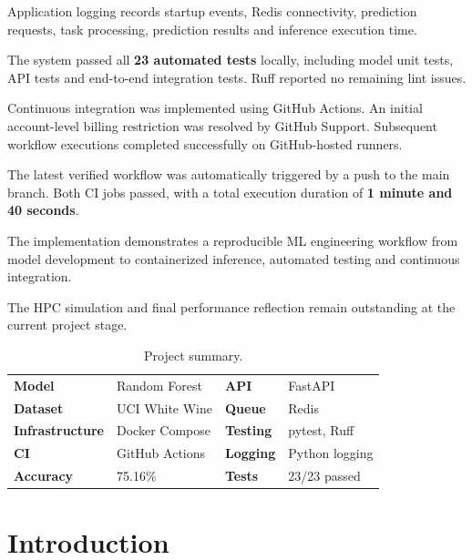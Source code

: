 \documentclass[11pt,a4paper]{article}
\begin{document}
Application logging records startup events, Redis
connectivity, prediction requests, task processing,
prediction results and inference execution time.

The system passed all \textbf{23 automated tests} locally,
including model unit tests, API tests and end-to-end
integration tests. Ruff reported no remaining lint issues.

Continuous integration was implemented using GitHub Actions.
An initial account-level billing restriction was resolved
by GitHub Support. Subsequent workflow executions completed
successfully on GitHub-hosted runners.

The latest verified workflow was automatically triggered
by a push to the main branch. Both CI jobs passed, with a
total execution duration of \textbf{1 minute and 40 seconds}.

The implementation demonstrates a reproducible ML
engineering workflow from model development to
containerized inference, automated testing and continuous
integration.

The HPC simulation and final performance reflection remain
outstanding at the current project stage.

\begin{table}[H]
\centering
\begin{tabularx}{\linewidth}{@{}lXlX@{}}
\toprule
\textbf{Model} & Random Forest &
\textbf{API} & FastAPI\\

\textbf{Dataset} & UCI White Wine &
\textbf{Queue} & Redis\\

\textbf{Infrastructure} & Docker Compose &
\textbf{Testing} & pytest, Ruff\\

\textbf{CI} & GitHub Actions &
\textbf{Logging} & Python logging\\

\textbf{Accuracy} & 75.16\% &
\textbf{Tests} & 23/23 passed\\
\bottomrule
\end{tabularx}
\caption{Project summary.}
\end{table}

\clearpage
\tableofcontents
\clearpage


\section{Introduction}
\end{document}
